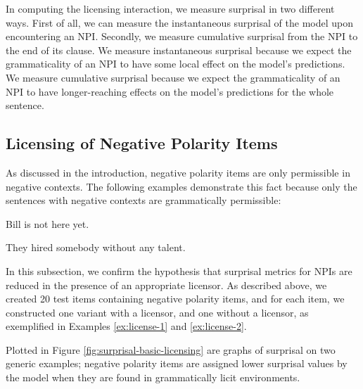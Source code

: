 \documentclass[11pt, round]{article}
\begin{document}
In computing the licensing interaction, we measure surprisal in two different ways. First of all, we can measure the instantaneous surprisal of the model upon encountering an NPI. Secondly, we measure cumulative surprisal from the NPI to the end of its clause. We measure instantaneous surprisal because we expect the grammaticality of an NPI to have some local effect on the model's predictions. We measure cumulative surprisal because we expect the grammaticality of an NPI to have longer-reaching effects on the model's predictions for the whole sentence.

\subsection{Licensing of Negative Polarity Items}
\label{sec:basic}

As discussed in the introduction, negative polarity items are only permissible in negative contexts. The following examples demonstrate this fact because only the sentences with negative contexts are grammatically permissible:
\begin{exe}
\ex\label{ex:license-1}
\begin{xlist}
\ex Bill is not here yet.
\end{xlist}
\ex\label{ex:license-2}
\begin{xlist}
\ex They hired somebody without any talent.
\end{xlist}
\end{exe}
In this subsection, we confirm the hypothesis that surprisal metrics for NPIs are reduced in the presence of an appropriate licensor. As described above, we created 20 test items containing negative polarity items, and for each item, we constructed one variant with a licensor, and one without a licensor, as exemplified in Examples \ref{ex:license-1} and \ref{ex:license-2}.

Plotted in Figure \ref{fig:surprisal-basic-licensing} are graphs of surprisal on two generic examples; negative polarity items are assigned lower surprisal values by the model when they are found in grammatically licit environments. 
\end{document}
